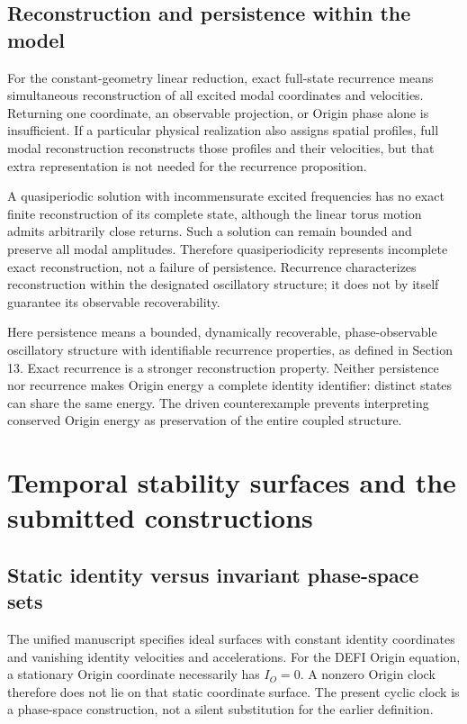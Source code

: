 \documentclass[aip,adv,preprint,floatfix]{revtex4-2}
\begin{document}
\subsection*{Reconstruction and persistence within the model}
For the constant-geometry linear reduction, exact full-state recurrence means simultaneous reconstruction of all excited modal coordinates and velocities. Returning one coordinate, an observable projection, or Origin phase alone is insufficient. If a particular physical realization also assigns spatial profiles, full modal reconstruction reconstructs those profiles and their velocities, but that extra representation is not needed for the recurrence proposition.

A quasiperiodic solution with incommensurate excited frequencies has no exact finite reconstruction of its complete state, although the linear torus motion admits arbitrarily close returns. Such a solution can remain bounded and preserve all modal amplitudes. Therefore quasiperiodicity represents incomplete exact reconstruction, not a failure of persistence. Recurrence characterizes reconstruction within the designated oscillatory structure; it does not by itself guarantee its observable recoverability.

Here persistence means a bounded, dynamically recoverable, phase-observable oscillatory structure with identifiable recurrence properties, as defined in Section 13. Exact recurrence is a stronger reconstruction property. Neither persistence nor recurrence makes Origin energy a complete identity identifier: distinct states can share the same energy. The driven counterexample prevents interpreting conserved Origin energy as preservation of the entire coupled structure.

\section{Temporal stability surfaces and the submitted constructions}
\subsection*{Static identity versus invariant phase-space sets}
The unified manuscript \cite{r3} specifies ideal surfaces with constant identity coordinates and vanishing identity velocities and accelerations. For the DEFI Origin equation, a stationary Origin coordinate necessarily has $I_O=0$. A nonzero Origin clock therefore does not lie on that static coordinate surface. The present cyclic clock is a phase-space construction, not a silent substitution for the earlier definition.
\end{document}

